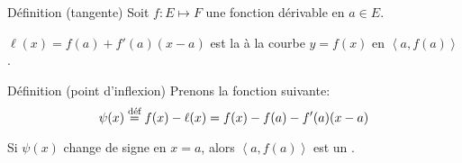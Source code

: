 \documentclass[a4paper]{article}
\begin{document}
\begin{parag}{Définition (tangente)}
    Soit $f : E \mapsto F$ une fonction dérivable en $a \in E$.

    $\ell\left(x\right) = f\left(a\right) + f'\left(a\right)\left(x - a\right)$ est la  à la courbe $y = f\left(x\right)$ en $\left<a, f\left(a\right)\right>$.
\end{parag}

\begin{parag}{Définition (point d'inflexion)}
    Prenons la fonction suivante:
    \[\psi\left(x\right) \over{=}{déf} f\left(x\right) - \ell\left(x\right) = f\left(x\right) - f\left(a\right) - f'\left(a\right)\left(x - a\right)\]

    Si $\psi\left(x\right)$ change de signe en $x=a$, alors $\left<a, f\left(a\right)\right>$ est un .

\end{parag}
\end{document}
